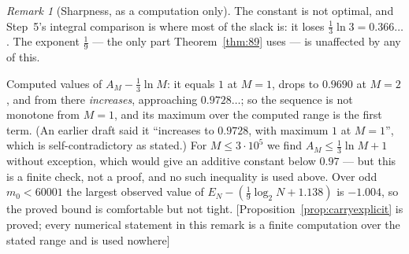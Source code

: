 \documentclass[11pt]{article}
\theoremstyle{plain}
\theoremstyle{definition}
\theoremstyle{remark}
\newtheorem{remark}[theorem]{Remark}
\newcommand{\status}[1]{\textsf{\footnotesize[#1]}}
\begin{document}
\begin{remark}[Sharpness, as a computation only]
The constant is not optimal, and Step~5's integral comparison is where most of the slack is: it
loses $\tfrac13\ln3=0.366\ldots$. The exponent $\tfrac19$ --- the only part
Theorem~\ref{thm:89} uses --- is unaffected by any of this.

Computed values of $A_M-\tfrac13\ln M$: it equals $1$ at $M=1$, drops to $0.9690$ at $M=2$, and
from there \emph{increases}, approaching $0.9728\ldots$; so the sequence is not monotone from
$M=1$, and its maximum over the computed range is the first term. (An earlier draft said it
``increases to $0.9728$, with maximum $1$ at $M=1$'', which is self-contradictory as stated.) For
$M\le3\cdot10^{5}$ we find $A_M\le\tfrac13\ln M+1$ without exception, which would give an additive
constant below $0.97$ --- but this is a finite check, not a proof, and no such inequality is used
above. Over odd $m_0<60001$ the largest observed value of $E_N-(\tfrac19\log_2 N+1.138)$ is
$-1.004$, so the proved bound is comfortable but not tight.
\status{Proposition~\ref{prop:carryexplicit} is proved; every numerical statement in this remark is
a finite computation over the stated range and is used nowhere}
\end{remark}
\end{document}
